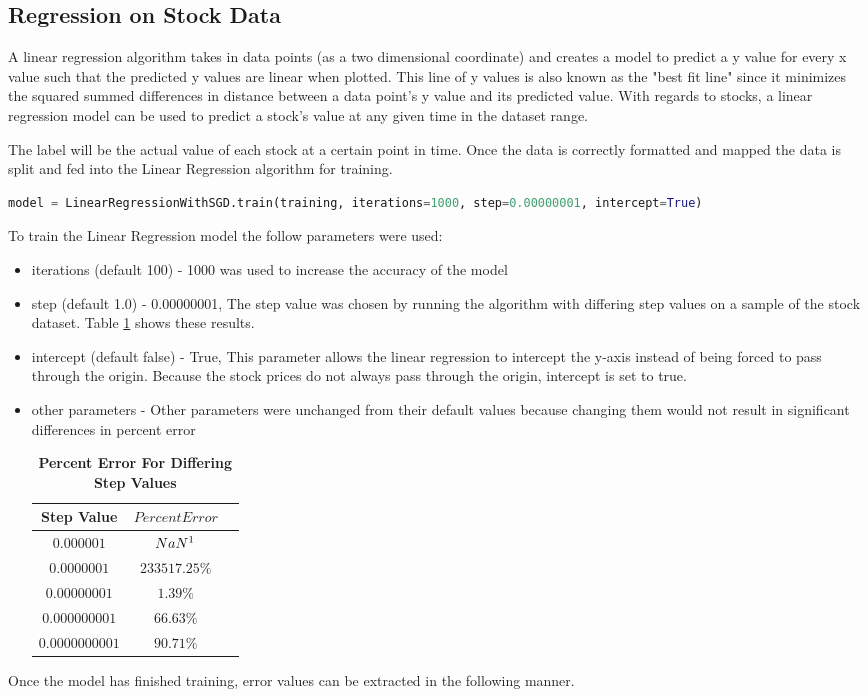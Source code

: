 \documentclass[9pt,twocolumn,twoside]{idsi}
\begin{document}
\subsection{Regression on Stock Data}
A linear regression algorithm takes in data points (as a two dimensional coordinate) and creates a model to predict a y value for every x value such that the predicted y values are linear when plotted. This line of y values is also known as the "best fit line" since it minimizes the squared summed differences in distance between a data point's y value and its predicted value. With regards to stocks, a linear regression model can be used to predict a stock's value at any given time in the dataset range.

The label will be the actual value of each stock at a certain point in time. Once the data is correctly formatted and mapped the data is split and fed into the Linear Regression algorithm for training.

\begin{lstlisting}[language=Python, breaklines=true]
    model = LinearRegressionWithSGD.train(training, iterations=1000, step=0.00000001, intercept=True)
\end{lstlisting}

To train the Linear Regression model the follow parameters were used:
\begin{itemize}
	\item iterations (default 100) - 1000 was used to increase the accuracy of the model
   	\item step (default 1.0) - 0.00000001, The step value was chosen by running the algorithm with differing step values on a sample of the stock dataset.
Table \ref{tab:step_percenterror} shows these results. 
	\item intercept (default false) - True, This parameter allows the linear regression to intercept the y-axis instead of being forced  to pass through the origin. Because the stock prices do not always pass through the origin, intercept is set to true. 
    \item other parameters - Other parameters were unchanged from their default values because changing them would not result in significant differences in percent error
\begin{table}[htbp]
\centering
\caption{\bf Percent Error For Differing Step Values}
\begin{tabular}{ccc}
\hline
Step Value & $ Percent Error $ \\
\hline
$0.000001$ & $NaN\footnotemark$ \\
$0.0000001$ & $233517.25\%$ \\
$0.00000001$ & $1.39\%$ \\
$0.000000001$ & $66.63\%$ \\
$0.0000000001$ & $90.71\%$ \\
\hline
\end{tabular}
  \label{tab:step_percenterror}
\end{table}
\end{itemize}
Once the model has finished training, error values can be extracted in the following manner.
\end{document}
